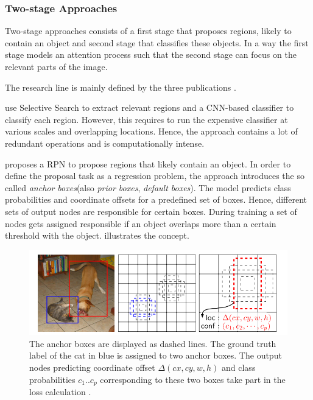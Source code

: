 	
	\subsubsection{Two-stage Approaches}
	
	Two-stage approaches consists of a first stage that proposes regions, likely to contain an object and second stage that classifies these objects. In a way the first stage models an attention process such that the second stage can focus on the relevant parts of the image.

	The research line is mainly defined by the three publications \cite{Girshick2013,Ren,Ren2015}.
	
\citeauthor{Girshick2013} \cite{Girshick2013} use Selective Search to extract relevant regions and a \ac{CNN}-based classifier to classify each region. However, this requires to run the expensive classifier at various scales and overlapping locations. Hence, the approach contains a lot of redundant operations and is computationally intense.

\citeauthor{Ren} \cite{Ren} proposes a \ac{RPN} to propose regions that likely contain an object. In order to define the proposal task as a regression problem, the approach introduces the so called \textit{anchor boxes}(also \textit{prior boxes}, \textit{default boxes}). The model predicts class probabilities and coordinate offsets for a predefined set of boxes. Hence, different sets of output nodes are responsible for certain boxes. During training a set of nodes gets assigned responsible if an object overlaps more than a certain threshold with the object.  illustrates the concept.

\begin{figure}[hbtp]
	
	\centering
	\captionsetup{justification=raggedright,singlelinecheck=false}
	\includegraphics[width=0.8\linewidth]{fig/anchors}
	\caption{The anchor boxes are displayed as dashed lines. The ground truth label of the cat in blue is assigned to two anchor boxes. The output nodes predicting coordinate offset $\Delta(cx, cy, w,h)$ and class probabilities $c_1 .. c_p$ corresponding to these two boxes take part in the loss calculation \cite{Liu}.}
	\label{fig:anchors}
	
\end{figure}

